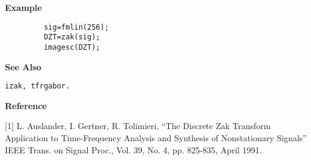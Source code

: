 {\bf \large {}\selectfont Example}
\begin{verbatim}
         sig=fmlin(256); 
         DZT=zak(sig);
         imagesc(DZT);
\end{verbatim}
\vspace*{.5cm}

{\bf \large {}\selectfont See Also}\\
\hspace*{1.5cm}
\begin{minipage}[t]{13.5cm}
\begin{verbatim}
izak, tfrgabor.
\end{verbatim}
\end{minipage}
\vspace*{.5cm}


{\bf \large {}\selectfont Reference}\\
\hspace*{1.5cm}
\begin{minipage}[t]{13.5cm}
[1] L. Auslander, I. Gertner, R. Tolimieri, ``The Discrete Zak Transform
Application to Time-Frequency Analysis and Synthesis of Nonstationary
Signals'' IEEE Trans. on Signal Proc., Vol. 39, No. 4, pp. 825-835, April
1991.
\end{minipage}

